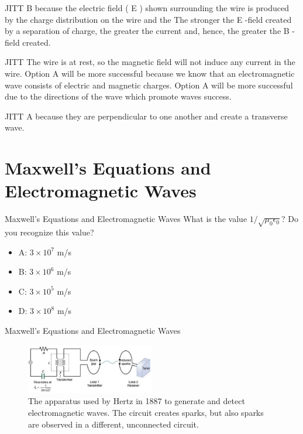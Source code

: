 \documentclass{beamer}
\begin{document}
\begin{frame}{JITT}
B because the electric field ( E ) shown surrounding the wire is produced by the charge distribution on the wire and the The stronger the E -field created by a separation of charge, the greater the current and, hence, the greater the B -field created.
\end{frame}

\begin{frame}{JITT}
The wire is at rest, so the magnetic field will not induce any current in the wire. Option A will be more successful because we know that an electromagnetic wave consists of electric and magnetic charges. Option A will be more successful due to the directions of the wave which promote waves success. 
\end{frame}

\begin{frame}{JITT}
A because they are perpendicular to one another and create a transverse wave.
\end{frame}

\section{Maxwell's Equations and Electromagnetic Waves}

\begin{frame}{Maxwell's Equations and Electromagnetic Waves}
What is the value $1/\sqrt{\mu_0 \epsilon_0}$?  Do you recognize this value?
\begin{itemize}
\item A: $3 \times 10^{7}$ m/s
\item B: $3 \times 10^{6}$ m/s
\item C: $3 \times 10^{5}$ m/s
\item D: $3 \times 10^{8}$ m/s
\end{itemize}
\end{frame}

\begin{frame}{Maxwell's Equations and Electromagnetic Waves}
\begin{figure}
\centering
\includegraphics[width=0.5\textwidth]{figures/hertz.png}
\caption{\label{fig:hertz} The apparatus used by Hertz in 1887 to generate and detect electromagnetic waves.  The circuit creates sparks, but also sparks are observed in a different, unconnected circuit.}
\end{figure}
\end{frame}
\end{document}
